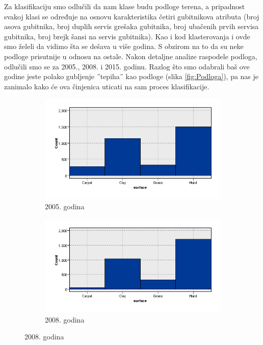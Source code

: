 \documentclass[a4paper]{article}
\begin{document}
Za klasifikaciju smo odlučili da nam klase budu podloge terena, a pripadnost svakoj klasi se određuje na osnovu karakteristika četiri gubitnikova atributa (broj asova gubitnika, broj duplih servis grešaka gubitnika, broj ubačenih prvih servisa gubitnika, broj brejk šansi na servis gubitnika). Kao i kod klasterovanja i ovde smo želeli da vidimo šta se dešava u više godina. S obzirom na to da su neke podloge prisutnije u odnosu na ostale. Nakon detaljne analize raspodele podloga, odlučili smo se za 2005., 2008. i 2015. godinu. Razlog što smo odabrali baš ove godine jeste polako gubljenje ˝tepiha˝ kao podloge (slika \ref{fig:Podloga}), pa nas je zanimalo kako će ova činjenica uticati na sam proces klasifikacije. 

\begin{figure}[H]
	\begin{subfigure}[h]{\textwidth}
		\begin{center}
			\includegraphics[scale=0.30]{Klasifikacija/HistogramiPodlogaTerena/Graphboard2005.png}
		\end{center}
		\caption{2005. godina}
		\label{fig:Podloga2005}
	\end{subfigure}

	\vspace{0.5cm}
	\begin{subfigure}[h]{\textwidth}
		\begin{center}
			\includegraphics[scale=0.30]{Klasifikacija/HistogramiPodlogaTerena/Graphboard2008.png}
		\end{center}
		\caption{2008. godina}
		\label{fig:Podloga2008}
	\end{subfigure}


\end{figure}
\end{document}
